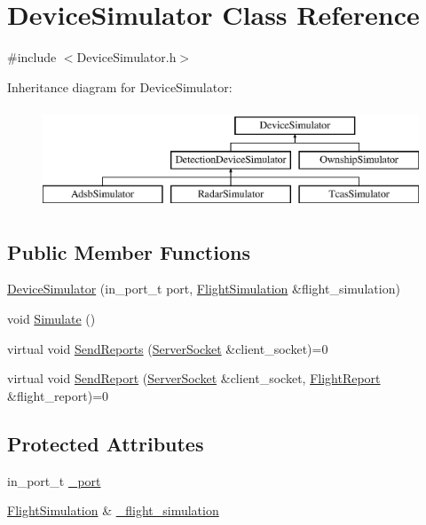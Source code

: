 \hypertarget{class_device_simulator}{}\section{Device\+Simulator Class Reference}
\label{class_device_simulator}


{\ttfamily \#include $<$Device\+Simulator.\+h$>$}

Inheritance diagram for Device\+Simulator\+:\begin{figure}[H]
\begin{center}
\leavevmode
\includegraphics[height=3.000000cm]{class_device_simulator}
\end{center}
\end{figure}
\subsection*{Public Member Functions}
\begin{DoxyCompactItemize}
\item 
\hyperlink{class_device_simulator_ad3403da66a9159a9407941d2925a3159}{Device\+Simulator} (in\+\_\+port\+\_\+t port, \hyperlink{class_flight_simulation}{Flight\+Simulation} \&flight\+\_\+simulation)
\item 
void \hyperlink{class_device_simulator_a02269ccaa976f7586931ed3db05a1887}{Simulate} ()
\item 
virtual void \hyperlink{class_device_simulator_a2c63437b2c443a7c1e7dcda80c5efe77}{Send\+Reports} (\hyperlink{class_server_socket}{Server\+Socket} \&client\+\_\+socket)=0
\item 
virtual void \hyperlink{class_device_simulator_ac41c9ef2046591fe7f62b55ef5f0de22}{Send\+Report} (\hyperlink{class_server_socket}{Server\+Socket} \&client\+\_\+socket, \hyperlink{class_flight_report}{Flight\+Report} \&flight\+\_\+report)=0
\end{DoxyCompactItemize}
\subsection*{Protected Attributes}
\begin{DoxyCompactItemize}
\item 
in\+\_\+port\+\_\+t \hyperlink{class_device_simulator_a2d67d85410bca0c3f8080ad51fcf8f49}{\+\_\+port}
\item 
\hyperlink{class_flight_simulation}{Flight\+Simulation} \& \hyperlink{class_device_simulator_a39367b0a28cf99fbb615661f78a71f70}{\+\_\+flight\+\_\+simulation}
\end{DoxyCompactItemize}
